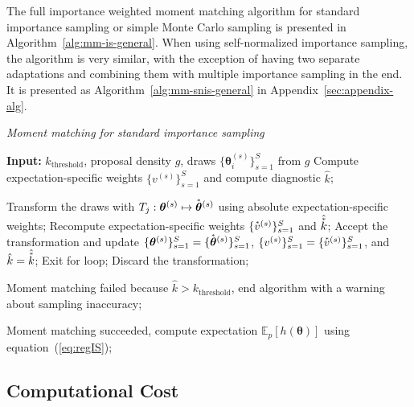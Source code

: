 \documentclass[12pt]{article}
\newcommand{\ome}{v}
\newcommand{\transf}{\accentset{\ast}}
\begin{document}
The full importance weighted moment matching algorithm for standard importance sampling or simple Monte Carlo sampling
is presented in Algorithm~\ref{alg:mm-is-general}.
When using self-normalized importance sampling, the algorithm
is very similar, with the exception of
having two separate adaptations and combining them with multiple
importance sampling in the end. It
is presented as Algorithm~\ref{alg:mm-snis-general} in Appendix~\ref{sec:appendix-alg}.





\begin{algorithm*}[htb]
\caption{\em Moment matching for standard importance sampling}\label{alg:mm-is-general}
\begin{algorithmic}[1]
\STATE \textbf{Input:} $k_{\text{threshold}}$, proposal density $g$, draws $\{ \boldsymbol{\theta}_i^{(s)} \}_{s = 1}^S$ from $g$
\STATE Compute expectation-specific weights $\{  \ome^{(s)}  \}_{s = 1}^S$ and compute diagnostic $\hat{k}$;
%
%


%
%
\STATE Transform the draws with $T_j: \boldsymbol{\theta}^{(s)} \mapsto \transf{\boldsymbol{\theta}}^{(s)}$ using absolute expectation-specific weights;
\STATE Recompute expectation-specific weights $\{  \transf{\ome}^{(s)}  \}_{s = 1}^S$ and $\hat{\transf{k}}$;
\IF{$\hat{\transf{k}} < \hat{k}$}
\STATE Accept the transformation and update $\{ \boldsymbol{\theta}^{(s)} \}_{s = 1}^S = \{ \transf{\boldsymbol{\theta}}^{(s)} \}_{s = 1}^S$, $\{  \ome^{(s)} \}_{s = 1}^S = \{ \transf{\ome}^{(s)} \}_{s = 1}^S$, and $\hat{k} = \hat{\transf{k}}$;
\STATE Exit for loop;
\ELSE
\STATE Discard the transformation;
\ENDIF

\STATE Moment matching failed because $\hat{k} > k_{\text{threshold}}$, end algorithm with a warning about sampling inaccuracy;
\ENDIF

\ENDFOR
\ENDWHILE
 
\STATE Moment matching succeeded, compute expectation $\mathbb{E}_p [h(\boldsymbol{\theta})]$ using equation~(\ref{eq:regIS});
 
\end{algorithmic}
\end{algorithm*}









\subsection{Computational Cost} \label{sec:cost}
\end{document}
